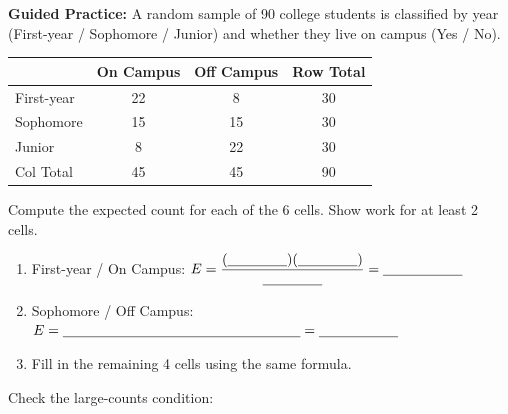 \documentclass[10pt]{article}
\begin{document}
\begin{practicebox}
\textbf{Guided Practice:} A random sample of 90 college students is classified by year
(First-year / Sophomore / Junior) and whether they live on campus (Yes / No).

\renewcommand{\arraystretch}{1.6}
\begin{tabular}{lccc}
             & \textbf{On Campus} & \textbf{Off Campus} & \textbf{Row Total} \\
    \hline
    First-year  & 22 & 8  & 30 \\
    Sophomore   & 15 & 15 & 30 \\
    Junior      & 8  & 22 & 30 \\
    \hline
    Col Total   & 45 & 45 & 90 \\
\end{tabular}

\vspace{0.1in}
Compute the expected count for each of the 6 cells. Show work for at least 2 cells.

\begin{enumerate}
  \item First-year / On Campus: $E = \dfrac{(\blank{1.5cm})(\blank{1.5cm})}{\blank{1.5cm}} = \blank{2cm}$
        \vspace{0.05in}
  \item Sophomore / Off Campus: $E = \blank{6cm} = \blank{2cm}$
        \vspace{0.05in}
  \item Fill in the remaining 4 cells using the same formula.
\end{enumerate}

Check the large-counts condition: \writeline
\end{practicebox}
\end{document}
